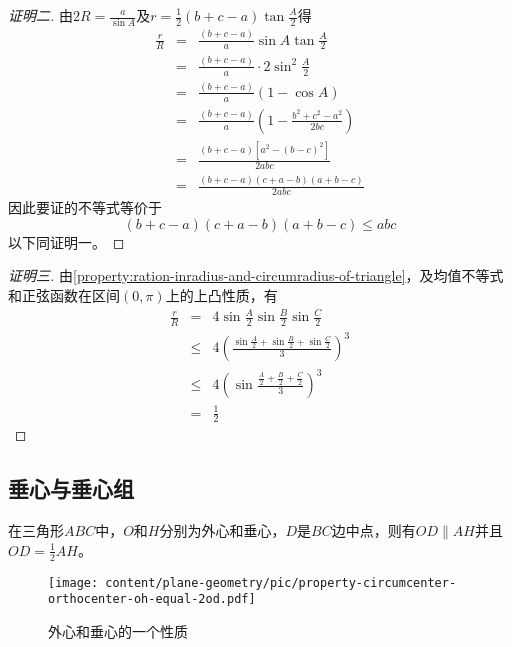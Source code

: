 \begin{proof}[证明二]
  由$2R=\frac{a}{\sin{A}}$及$r=\frac{1}{2}(b+c-a)\tan{\frac{A}{2}}$得
  \begin{eqnarray*}
    \frac{r}{R} & = & \frac{(b+c-a)}{a}\sin{A}\tan{\frac{A}{2}} \\
                & = & \frac{(b+c-a)}{a} \cdot 2\sin^2{\frac{A}{2}} \\
                & = & \frac{(b+c-a)}{a} (1-\cos{A}) \\
                & = & \frac{(b+c-a)}{a} \left( 1-\frac{b^2+c^2-a^2}{2bc} \right) \\
                & = & \frac{(b+c-a)[a^2-(b-c)^2]}{2abc} \\
    & = & \frac{(b+c-a)(c+a-b)(a+b-c)}{2abc}
  \end{eqnarray*}
  因此要证的不等式等价于
  \[
    (b+c-a)(c+a-b)(a+b-c) \leqslant abc
  \]
  以下同证明一。
\end{proof}

\begin{proof}[证明三]
  由\autoref{property:ration-inradius-and-circumradius-of-triangle}，及均值不等式和正弦函数在区间$(0,\pi)$上的上凸性质，有
  \begin{eqnarray*}
    \frac{r}{R} & = & 4\sin{\frac{A}{2}}\sin{\frac{B}{2}}\sin{\frac{C}{2}} \\
                & \leqslant & 4 \left( \frac{\sin{\frac{A}{2}}+\sin{\frac{B}{2}}+\sin{\frac{C}{2}}}{3} \right)^3 \\
                & \leqslant & 4 \left( \sin{\frac{\frac{A}{2}+\frac{B}{2}+\frac{C}{2}}{3}} \right)^3 \\
    & = & \frac{1}{2}
  \end{eqnarray*}
\end{proof}

\subsection{垂心与垂心组}
\label{sec:triangle-orthocentre}

\begin{property}
  \label{property:circumcenter-orthocenter-ah-equal-2od}
  在三角形$ABC$中，$O$和$H$分别为外心和垂心，$D$是$BC$边中点，则有$OD \parallel AH$并且$OD = \frac{1}{2} AH$。
\end{property}

\begin{figure}[htbp]
\centering
\texttt{[image: content/plane-geometry/pic/property-circumcenter-orthocenter-oh-equal-2od.pdf]}
\caption{外心和垂心的一个性质}
\label{fig:property-circumcenter-orthocenter-oh-equal-2od}
\end{figure}

